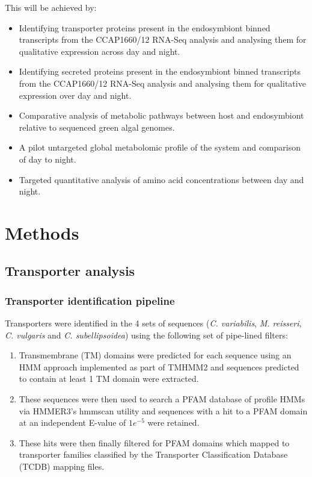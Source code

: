 This will be achieved by:
\begin{itemize}
\item Identifying
    transporter proteins present in the endosymbiont
    binned transcripts from the CCAP1660/12 RNA-Seq analysis
    and analysing them for qualitative 
    expression across day and night. 
\item Identifying
    secreted proteins present in the endosymbiont
    binned transcripts from the CCAP1660/12 RNA-Seq analysis
    and analysing them for qualitative 
    expression over day and night. 
\item Comparative analysis of metabolic pathways 
    between host and endosymbiont relative to 
    sequenced green algal genomes. 
\item A pilot untargeted global metabolomic profile of the 
    system and comparison of day to night.
\item Targeted quantitative analysis of amino acid concentrations
    between day and night. 
\end{itemize}

\section{Methods}

\subsection{Transporter analysis} 

\subsubsection{Transporter identification pipeline}

Transporters were identified in the 4 sets of sequences (\textit{C. variabilis}, \textit{M. reisseri},
\textit{C. vulgaris} and \textit{C. subellipsoidea}) using the following set of pipe-lined filters:
\begin{enumerate}
    \item Transmembrane (TM) domains were predicted for each sequence using an HMM approach implemented 
        as part of TMHMM2 \citep{Sonnhammer1998,Krogh2001}
and sequences predicted to contain at least 1 TM domain were extracted.
    \item These sequences were then used to search a PFAM database of profile HMMs \citep{Eddy1995} 
        via HMMER3's hmmscan utility \citep{Eddy1995,Johnson2010,Eddy2011,Mistry2013}
        and sequences with a hit to a PFAM domain at an independent E-value of \(1e^{-5}\) were retained.
    \item These hits were then finally filtered for PFAM domains which mapped to transporter 
        families classified by the Transporter Classification Database (TCDB) \citep{Saier2006,Saier2009,Saier2014}
        mapping files.
\end{enumerate}

